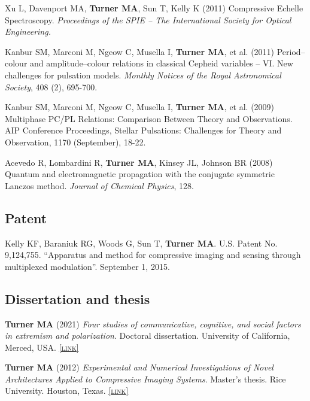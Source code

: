 \documentclass[11pt, letterpaper]{article}
\newcommand{\lurl}[1]{\href{#1}{\scriptsize\textsc{[link]}}}
\begin{document}
    Xu L, Davenport MA, \textbf{Turner MA}, Sun T, Kelly K (2011) Compressive Echelle Spectroscopy. \emph{Proceedings of the SPIE – The International Society for Optical Engineering.}

    Kanbur SM, Marconi M, Ngeow C, Musella I, \textbf{Turner MA}, et al. (2011) Period–colour and amplitude–colour relations in classical Cepheid variables – VI. New challenges for pulsation models. \emph{Monthly Notices of the Royal Astronomical Society}, 408 (2), 695-700.

    Kanbur SM, Marconi M, Ngeow C, Musella I, \textbf{Turner MA}, et al. (2009) Multiphase PC/PL Relations: Comparison Between Theory and Observations. AIP Conference Proceedings, Stellar Pulsations: Challenges for Theory and Observation, 1170 (September), 18-22.

    Acevedo R, Lombardini R, \textbf{Turner MA}, Kinsey JL, Johnson BR (2008)
    Quantum and electromagnetic propagation with the conjugate symmetric
    Lanczos method. \emph{Journal of Chemical Physics}, 128.




    \subsection{Patent}

  Kelly KF, Baraniuk RG, Woods G, Sun T, \textbf{Turner MA}. U.S. Patent No. 9,124,755. 
  ``Apparatus and method for compressive imaging and sensing through multiplexed modulation''.
  September 1, 2015.

  \subsection{Dissertation and thesis}

  \textbf{Turner MA} (2021) \emph{Four studies of communicative, cognitive,
  and social factors in extremism and polarization}. Doctoral dissertation.
  University of California, Merced, USA. \lurl{https://escholarship.org/uc/item/56h2v4bg}

  \textbf{Turner MA} (2012) \emph{Experimental and Numerical
  Investigations of Novel Architectures Applied to Compressive
Imaging Systems}. Master's thesis. Rice University. Houston,
Texas. \lurl{https://www.researchgate.net/publication/274720620_Experimental_and_Numerical_In vestigations_of_Novel_Architectures_Applied_to_Compressive_Imaging_Systems}
\end{document}
